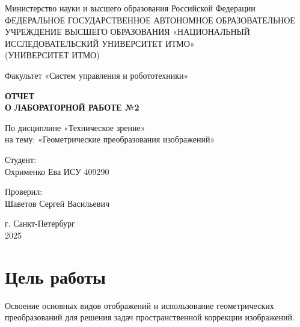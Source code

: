 \documentclass[a4paper,12pt]{article}
\begin{document}
\begin{titlepage}
    \centering
    \vspace*{1cm}

    {\large Министерство науки и высшего образования Российской Федерации}\\
    {\large ФЕДЕРАЛЬНОЕ ГОСУДАРСТВЕННОЕ АВТОНОМНОЕ ОБРАЗОВАТЕЛЬНОЕ УЧРЕЖДЕНИЕ ВЫСШЕГО ОБРАЗОВАНИЯ «НАЦИОНАЛЬНЫЙ ИССЛЕДОВАТЕЛЬСКИЙ УНИВЕРСИТЕТ ИТМО»}\\
    {\large (УНИВЕРСИТЕТ ИТМО)}\\

    \vspace{2cm}

    {\large Факультет «Систем управления и робототехники»}\\

    \vspace{3cm}

    \textbf{{\Huge ОТЧЕТ}\\
    {\Huge О ЛАБОРАТОРНОЙ РАБОТЕ №2}}\\

    \vspace{1cm}

    {\LARGE По дисциплине «Техническое зрение»}\\
    {\LARGE на тему: «Геометрические преобразования изображений»}\\

    \vspace{2cm}

    {\Large Студент:}\\
    Охрименко Ева ИСУ 409290\\

    \vspace{2cm}

    {\Large Проверил:}\\
    Шаветов Сергей Васильевич\\

    \vspace{4cm}

    {\large г. Санкт-Петербург}\\
    {\large 2025}

\end{titlepage}

\tableofcontents  %
\newpage

\section{Цель работы}
Освоение основных видов отображений и использование геометрических преобразований для решения задач пространственной коррекции изображений.
\end{document}
